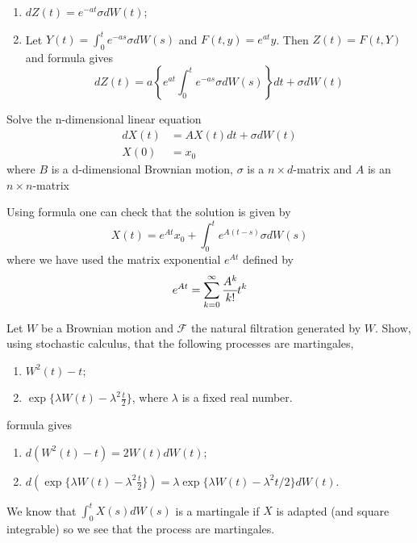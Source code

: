 \documentclass[12pt,a4paper]{exam}
\begin{document}
\begin{questions}
\begin{solution}
\begin{solution}
\begin{solution}
\begin{enumerate}[label=(\alph*),font=\itshape]
\item $dZ(t) = e^{-at}\sigma dW(t)$;
\item Let $Y(t)=\int_0^t e^{-as}\sigma dW(s)$ and $F(t, y)=e^{at}y$. Then $Z(t)=F(t, Y)$ and \ito formula gives
\begin{equation*}
dZ(t) = a\left\{e^{at}\int_0^t e^{-as}\sigma dW(s)\right\}dt + \sigma dW(t)
\end{equation*}
\end{enumerate}
\end{solution}

\question Solve the n-dimensional linear equation
\begin{equation*}
\begin{aligned}
dX(t) &= AX(t) dt + \sigma dW(t)\\
X(0) &= x_0
\end{aligned}
\end{equation*}
where $B$ is a d-dimensional Brownian motion, $\sigma$ is a $n\times d$-matrix and $A$ is an $n\times n$-matrix
\fillwithlines{3cm}

\begin{solution}
Using \ito formula one can check that the solution is given by
\begin{equation*}
X(t) = e^{At}x_0 + \int_0^te^{A(t-s)}\sigma dW(s)
\end{equation*}
where we have used the matrix exponential $e^{At}$ defined by
\begin{equation*}
e^{At} = \sum_{k=0}^{\infty} \cfrac{A^k}{k!}t^k
\end{equation*}
\end{solution}

\question Let $W$ be a Brownian motion and $\mathcal{F}$ the natural filtration generated by $W$. Show, using stochastic calculus, that the following processes are martingales,
\begin{enumerate}[label=(\alph*),font=\itshape]
\item $W^2(t) - t$;
\item $\exp\{\lambda W(t) - \lambda^2\frac{t}{2}\}$, where $\lambda$ is a fixed real number.
\end{enumerate}
\fillwithlines{3cm}

\begin{solution}
\ito formula gives
\begin{enumerate}[label=(\alph*),font=\itshape]
\item $d(W^2(t) - t) = 2W(t)dW(t)$;
\item $d(\exp\{\lambda W(t) - \lambda^2\frac{t}{2}\}) = \lambda\exp\{\lambda W(t) - \lambda^2t/2\}dW(t)$.
\end{enumerate}
We know that $\int_0^tX(s)dW(s)$ is a martingale if $X$ is adapted (and square integrable) so we see that the process are martingales.
\end{solution}


\end{solution}
\end{solution}
\end{questions}
\end{document}
